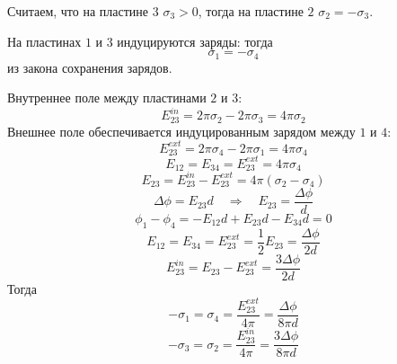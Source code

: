 \documentclass[a4paper,14pt]{extarticle}
\begin{document}
\begin{figure}[H]
    \centering
\end{figure}
Считаем, что на пластине $3$ $\sigma_3>0$, тогда на пластине $2$ $\sigma_2=-\sigma_3$.

На пластинах $1$ и $3$ индуцируются заряды: тогда 
\begin{equation}
	\sigma_1=-\sigma_4
\end{equation}
из закона сохранения зарядов.

Внутреннее поле между пластинами $2$ и $3$:
\begin{equation}
	E_{23}^{in}=2\pi\sigma_2-2\pi\sigma_3=4\pi\sigma_2
\end{equation}
Внешнее поле обеспечивается индуцированным зарядом между $1$ и $4$:
\begin{equation}
	E_{23}^{ext}=2\pi\sigma_4-2\pi\sigma_1=4\pi\sigma_4
\end{equation}
\begin{equation}
	E_{12}=E_{34}=E_{23}^{ext}=4\pi\sigma_4
\end{equation}
\begin{equation}
	E_{23}=E_{23}^{in}-E_{23}^{ext}=4\pi(\sigma_2-\sigma_4)
\end{equation}
\begin{equation}
	\Delta\phi=E_{23}d \quad\Rightarrow\quad E_{23}=\frac{\Delta\phi}{d}
\end{equation}
\begin{equation}
	\phi_1-\phi_4=-E_{12}d+E_{23}d-E_{34}d=0
\end{equation}
\begin{equation}
	E_{12}=E_{34}=E_{23}^{ext}=\frac12E_{23}=\frac{\Delta\phi}{2d}
\end{equation}
\begin{equation}
	E_{23}^{in}=E_{23}-E_{23}^{ext}=\frac{3\Delta\phi}{2d}
\end{equation}
Тогда
\begin{equation}
	-\sigma_1=\sigma_4=\frac{E_{23}^{ext}}{4\pi}=\frac{\Delta\phi}{8\pi d}
\end{equation}
\begin{equation}
	-\sigma_3=\sigma_2=\frac{E_{23}^{in}}{4\pi}=\frac{3\Delta\phi}{8\pi d}
\end{equation}
\end{document}
